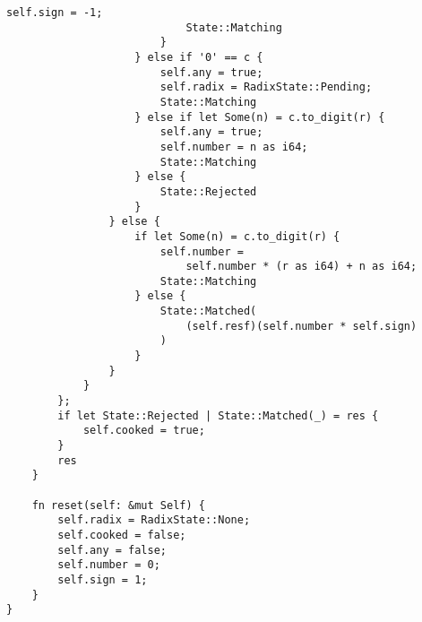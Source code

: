 \clearpage
\begin{lstlisting}[caption={Разбор целых чисел (часть 3)}, label={lst:rust_lexer_int3}]
                            self.sign = -1;
                            State::Matching
                        }
                    } else if '0' == c {
                        self.any = true;
                        self.radix = RadixState::Pending;
                        State::Matching
                    } else if let Some(n) = c.to_digit(r) {
                        self.any = true;
                        self.number = n as i64;
                        State::Matching
                    } else {
                        State::Rejected
                    }
                } else {
                    if let Some(n) = c.to_digit(r) {
                        self.number =
                            self.number * (r as i64) + n as i64;
                        State::Matching
                    } else {
                        State::Matched(
                            (self.resf)(self.number * self.sign)
                        )
                    }
                }
            }
        };
        if let State::Rejected | State::Matched(_) = res {
            self.cooked = true;
        }
        res
    }

    fn reset(self: &mut Self) {
        self.radix = RadixState::None;
        self.cooked = false;
        self.any = false;
        self.number = 0;
        self.sign = 1;
    }
}
\end{lstlisting}

